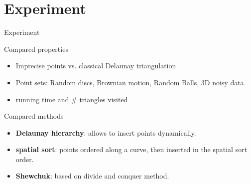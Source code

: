 \documentclass{beamer}
\begin{document}
%
%	


%
%
%
%

\section{Experiment}
\frame{\tableofcontents[currentsection]}
\begin{frame}{Experiment}



\begin{block}{Compared properties}
\begin{itemize}
\item Imprecise points vs. classical Delaunay triangulation
\item Point sets: Random discs, Brownian motion, Random Balls, 3D noisy data
\item running time and \# triangles visited
\end{itemize}
\end{block}

\begin{block}{Compared methods}
\begin{itemize}
\item \textbf{Delaunay hierarchy}: allows to insert points dynamically.\\
\item \textbf{spatial sort}: points ordered along a curve, then inserted in the spatial sort order. \\
\item \textbf{Shewchuk}: based on divide and conquer method.\\
\end{itemize}

\end{block}
\end{frame}
\end{document}
